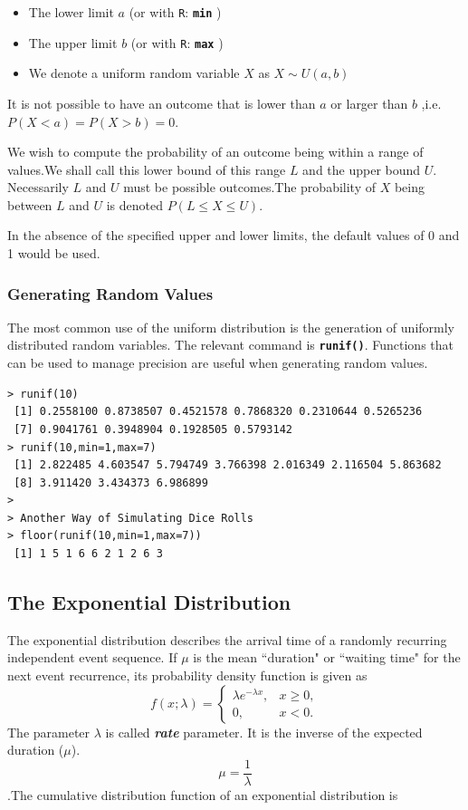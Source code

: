 \documentclass[a4paper,12pt]{article}
\begin{document}
\begin{itemize}
\item The lower limit $a$ (or with \texttt{R}: \texttt{\textbf{min}} )
\item The upper limit $b$ (or with \texttt{R}: \texttt{\textbf{max}} )
\item We denote a uniform random variable $X$ as $X \sim U(a,b)$
\end{itemize}

It is not possible to have an outcome that is lower than $a$ or larger than $b$ ,i.e. $ P(X < a) = P(X > b) = 0$.

We wish to compute the probability of an outcome being within a range of values.We shall call this lower bound of this range $L$ and the upper bound $ U$. Necessarily $L$ and $U$ must be possible outcomes.The probability of $X$ being between $L$ and $U$ is denoted $P( L \leq X \leq U )$.

In the absence of the specified upper and lower limits, the default values of 0 and 1 would be used.

\subsubsection{Generating Random Values}
The most common use of the uniform distribution is the generation of uniformly distributed random variables. The relevant command is \texttt{\textbf{runif()}}. Functions that can be used to manage precision are useful when generating random values.

\begin{verbatim}
> runif(10)
 [1] 0.2558100 0.8738507 0.4521578 0.7868320 0.2310644 0.5265236
 [7] 0.9041761 0.3948904 0.1928505 0.5793142
> runif(10,min=1,max=7)
 [1] 2.822485 4.603547 5.794749 3.766398 2.016349 2.116504 5.863682
 [8] 3.911420 3.434373 6.986899
>
> Another Way of Simulating Dice Rolls
> floor(runif(10,min=1,max=7))
 [1] 1 5 1 6 6 2 1 2 6 3
\end{verbatim}

\newpage
\subsection{The Exponential Distribution}

The exponential distribution describes the arrival time of a randomly recurring independent event sequence. If $\mu$ is the mean ``duration" or ``waiting time" for the next event recurrence, its probability density function is given as
\[
f(x;\lambda) = \begin{cases}
\lambda e^{-\lambda x}, & x \ge 0, \\
0, & x < 0.
\end{cases}\]
The parameter $\lambda$  is called \textbf{\emph{rate}} parameter. It is the inverse of the expected duration ($\mu$).\\
\[\mu= \frac{1}{\lambda}\].The cumulative distribution function of an exponential distribution is
\end{document}
